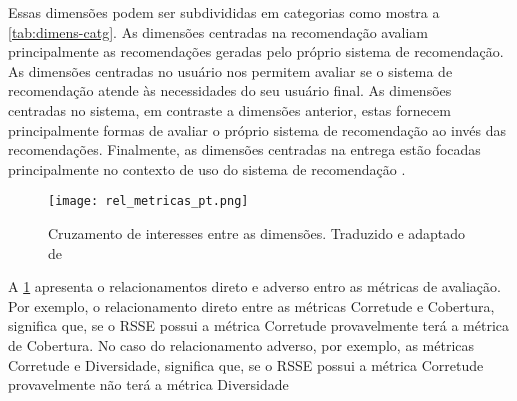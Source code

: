 Essas dimensões podem ser subdivididas em categorias como mostra a \ref{tab:dimens-catg}. As dimensões centradas na recomendação avaliam principalmente as recomendações geradas pelo próprio sistema de recomendação. As dimensões centradas no usuário nos permitem avaliar se o sistema de recomendação atende às necessidades do seu usuário final. As dimensões centradas no sistema, em contraste a dimensões anterior, estas fornecem principalmente formas de avaliar o próprio sistema de recomendação ao invés das recomendações. Finalmente, as dimensões centradas na entrega estão focadas principalmente no contexto de uso do sistema de recomendação \cite{robillard2010recommendation}.

\begin{figure}[htb]
	\centering					
	{\texttt{[image: rel\_metricas\_pt.png]}}
	
	\caption{Cruzamento de interesses entre as dimensões. Traduzido e adaptado de \citet{robillard2010recommendation}}
	\label{fig:rel_metricas}
\end{figure}

A \ref{fig:rel_metricas} apresenta o relacionamentos direto e adverso entro as métricas de avaliação. Por exemplo, o relacionamento direto entre as métricas Corretude e Cobertura, significa que, se o RSSE possui a métrica Corretude  provavelmente terá a métrica de Cobertura. No caso do relacionamento adverso, por exemplo, as métricas Corretude e Diversidade, significa que, se o RSSE possui a métrica Corretude provavelmente não terá a métrica Diversidade